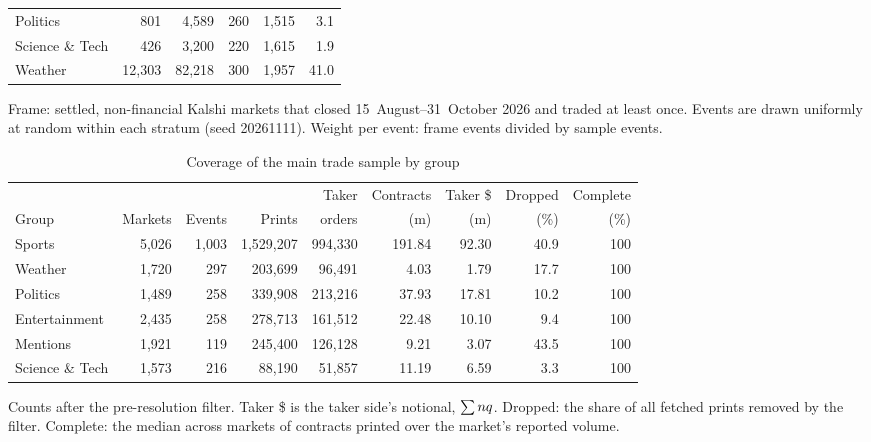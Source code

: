 \begin{table}[htbp]
\begin{threeparttable}
\begin{tabular}{lrrrrr}
Politics & 801 & 4,589 & 260 & 1,515 & 3.1 \\
Science \& Tech & 426 & 3,200 & 220 & 1,615 & 1.9 \\
Weather & 12,303 & 82,218 & 300 & 1,957 & 41.0 \\
\bottomrule
\end{tabular}
\begin{tablenotes}\footnotesize
\item Frame: settled, non-financial Kalshi markets that closed 15~August--31~October 2026 and
traded at least once. Events are drawn uniformly at random within each stratum (seed
20261111). Weight per event: frame events divided by sample events.
\end{tablenotes}
\end{threeparttable}
\end{table}

\begin{table}[htbp]
\centering
\begin{threeparttable}
\caption{Coverage of the main trade sample by group}\label{tab:flow-coverage}
\footnotesize
\setlength{\tabcolsep}{4pt}
\begin{tabular}{@{}lrrrrrrrr@{}}
\toprule
 & & & & Taker & Contracts & Taker \$ & Dropped & Complete \\
Group & Markets & Events & Prints & orders & (m) & (m) & (\%) & (\%) \\
\midrule
Sports & 5,026 & 1,003 & 1,529,207 & 994,330 & 191.84 & 92.30 & 40.9 & 100 \\
Weather & 1,720 & 297 & 203,699 & 96,491 & 4.03 & 1.79 & 17.7 & 100 \\
Politics & 1,489 & 258 & 339,908 & 213,216 & 37.93 & 17.81 & 10.2 & 100 \\
Entertainment & 2,435 & 258 & 278,713 & 161,512 & 22.48 & 10.10 & 9.4 & 100 \\
Mentions & 1,921 & 119 & 245,400 & 126,128 & 9.21 & 3.07 & 43.5 & 100 \\
Science \& Tech & 1,573 & 216 & 88,190 & 51,857 & 11.19 & 6.59 & 3.3 & 100 \\
\bottomrule
\end{tabular}
\begin{tablenotes}\footnotesize
\item Counts after the pre-resolution filter. Taker \$ is the taker side's notional,
$\sum nq$. Dropped: the share of all fetched prints removed by the filter. Complete: the median
across markets of contracts printed over the market's reported volume.
\end{tablenotes}
\end{threeparttable}
\end{table}

